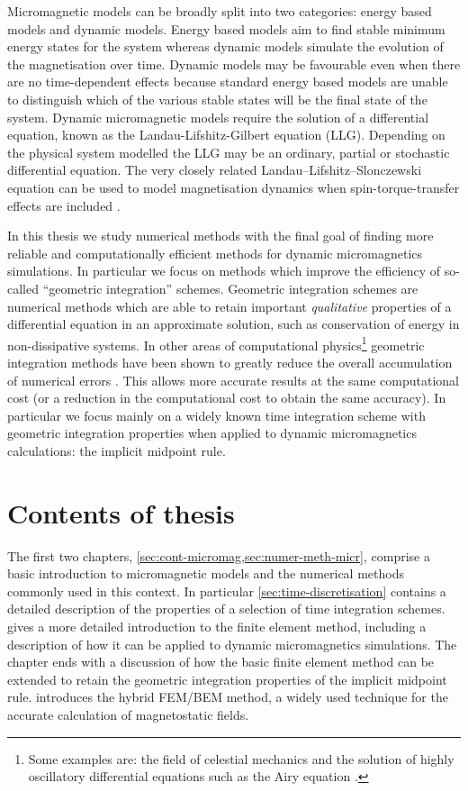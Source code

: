Micromagnetic models can be broadly split into two categories: energy based models and dynamic models.
Energy based models aim to find stable minimum energy states for the system whereas
dynamic models simulate the evolution of the magnetisation over time.
Dynamic models may be favourable even when there are no time-dependent effects because standard energy based models are unable to distinguish which of the various stable states will be the final state of the system.
Dynamic micromagnetic models require the solution of a differential equation, known as the Landau-Lifshitz-Gilbert equation (LLG).
Depending on the physical system modelled the LLG may be an ordinary, partial or stochastic differential equation.
The very closely related Landau–Lifshitz–Slonczewski equation can be used to model magnetisation dynamics when spin-torque-transfer effects are included \cite{Slonczewski1996}.


In this thesis we study numerical methods with the final goal of finding more reliable and computationally efficient methods for dynamic micromagnetics simulations.
In particular we focus on methods which improve the efficiency of so-called ``geometric integration'' schemes.
Geometric integration schemes are numerical methods which are able to retain important \emph{qualitative} properties of a differential equation in an approximate solution, such as conservation of energy in non-dissipative systems.
In other areas of computational physics\footnote{Some examples are: the field of celestial mechanics \cite{Gladman1991} and the solution of highly oscillatory differential equations such as the Airy equation \cite[98]{Iserles2009}.} geometric integration methods have been shown to greatly reduce the overall accumulation of numerical errors \cite[77]{Iserles2009}.
This allows more accurate results at the same computational cost (or a reduction in the computational cost to obtain the same accuracy).
In particular we focus mainly on a widely known time integration scheme with geometric integration properties when applied to dynamic micromagnetics calculations: the implicit midpoint rule.



\section{Contents of thesis}

The first two chapters, \cref{sec:cont-micromag,sec:numer-meth-micr}, comprise a basic introduction to micromagnetic models and the numerical methods commonly used in this context.
In particular \cref{sec:time-discretisation} contains a detailed description of the properties of a selection of time integration schemes.
 gives a more detailed introduction to the finite element method, including a description of how it can be applied to dynamic micromagnetics simulations.
The chapter ends with a discussion of how the basic finite element method can be extended to retain the geometric integration properties of the implicit midpoint rule.
 introduces the hybrid FEM/BEM method, a widely used technique for the accurate calculation of magnetostatic fields.

